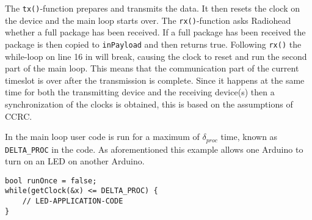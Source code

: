\bigskip \noindent
The \texttt{tx()}-function prepares and transmits the data.
It then resets the clock on the device and the main loop starts over.
The \texttt{rx()}-function asks Radiohead whether a full package has been received. 
If a full package has been received the package is then copied to \texttt{inPayload} and then returns true.
Following \texttt{rx()} the while-loop on line 16 in  will break, causing the clock to reset and run the second part of the main loop.
This means that the communication part of the current timeslot is over after the transmission is complete.
Since it happens at the same time for both the transmitting device and the receiving device(s) then a synchronization of the clocks is obtained, this is based on the assumptions of CCRC. 
 
In the main loop user code is run for a maximum of $\delta_{proc}$ time, known as \texttt{DELTA\_PROC} in the code.
As aforementioned this example allows one Arduino to turn on an LED on another Arduino. 

\begin{lstlisting}[style=customc,caption={While-loop with application code.},label={lst:ccrc:usercode}]
bool runOnce = false;
while(getClock(&x) <= DELTA_PROC) {
    // LED-APPLICATION-CODE
}
\end{lstlisting}